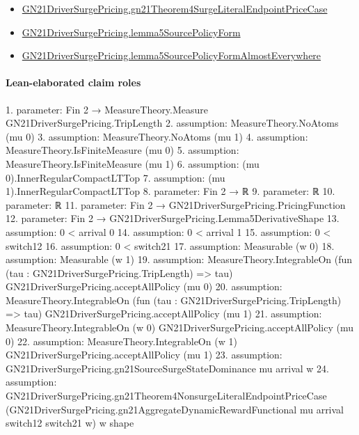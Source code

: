 \documentclass[10pt]{article}
\begin{document}
\begin{itemize}
\item \hyperlink{governing-declaration-8277bb51bc9219db}{GN21\allowbreak{}Driver\allowbreak{}Surge\allowbreak{}Pricing.\allowbreak{}gn21\allowbreak{}Theorem4\allowbreak{}Surge\allowbreak{}Literal\allowbreak{}Endpoint\allowbreak{}Price\allowbreak{}Case}
\item \hyperlink{governing-declaration-e4df3c35c7616cad}{GN21\allowbreak{}Driver\allowbreak{}Surge\allowbreak{}Pricing.\allowbreak{}lemma5\allowbreak{}Source\allowbreak{}Policy\allowbreak{}Form}
\item \hyperlink{governing-declaration-0b400bfc6ece079a}{GN21\allowbreak{}Driver\allowbreak{}Surge\allowbreak{}Pricing.\allowbreak{}lemma5\allowbreak{}Source\allowbreak{}Policy\allowbreak{}Form\allowbreak{}Almost\allowbreak{}Everywhere}
\end{itemize}
\paragraph{Lean-elaborated claim roles}\begin{ReviewVerbatim}
1. parameter: Fin 2 → MeasureTheory.Measure GN21DriverSurgePricing.TripLength
2. assumption: MeasureTheory.NoAtoms (mu 0)
3. assumption: MeasureTheory.NoAtoms (mu 1)
4. assumption: MeasureTheory.IsFiniteMeasure (mu 0)
5. assumption: MeasureTheory.IsFiniteMeasure (mu 1)
6. assumption: (mu 0).InnerRegularCompactLTTop
7. assumption: (mu 1).InnerRegularCompactLTTop
8. parameter: Fin 2 → ℝ
9. parameter: ℝ
10. parameter: ℝ
11. parameter: Fin 2 → GN21DriverSurgePricing.PricingFunction
12. parameter: Fin 2 → GN21DriverSurgePricing.Lemma5DerivativeShape
13. assumption: 0 < arrival 0
14. assumption: 0 < arrival 1
15. assumption: 0 < switch12
16. assumption: 0 < switch21
17. assumption: Measurable (w 0)
18. assumption: Measurable (w 1)
19. assumption: MeasureTheory.IntegrableOn (fun (tau : GN21DriverSurgePricing.TripLength) => tau) GN21DriverSurgePricing.acceptAllPolicy
  (mu 0)
20. assumption: MeasureTheory.IntegrableOn (fun (tau : GN21DriverSurgePricing.TripLength) => tau) GN21DriverSurgePricing.acceptAllPolicy
  (mu 1)
21. assumption: MeasureTheory.IntegrableOn (w 0) GN21DriverSurgePricing.acceptAllPolicy (mu 0)
22. assumption: MeasureTheory.IntegrableOn (w 1) GN21DriverSurgePricing.acceptAllPolicy (mu 1)
23. assumption: GN21DriverSurgePricing.gn21SourceSurgeStateDominance mu arrival w
24. assumption: GN21DriverSurgePricing.gn21Theorem4NonsurgeLiteralEndpointPriceCase
  (GN21DriverSurgePricing.gn21AggregateDynamicRewardFunctional mu arrival switch12 switch21 w) w shape

\end{ReviewVerbatim}
\end{document}
